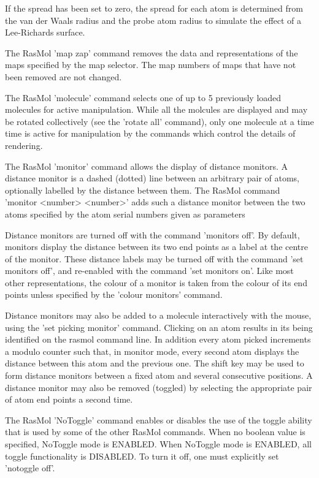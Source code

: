 If the spread has been set to zero, the spread for each atom is determined
from the van der Waals radius and the probe atom radius to simulate the
effect of a Lee-Richards surface.

The RasMol
'map zap'
command removes the data and representations of the
maps specified by the map selector.  The map numbers
of maps that have not been removed are not changed.

The RasMol
'molecule'
command selects one of up to 5 previously loaded molecules
for active manipulation.  While all the molcules are displayed
and may be rotated collectively (see the
'rotate all'
command), only one molecule at a time
time is active for manipulation by the commands which
control the details of rendering.

The RasMol
'monitor'
command allows the display of distance monitors. A distance
monitor is a dashed (dotted) line between an arbitrary pair
of atoms, optionally labelled by the distance between them.
The RasMol command
'monitor <number> <number>'
adds such a distance monitor between the two atoms specified by the atom
serial numbers given as parameters

Distance monitors are turned off with the command
'monitors off'.
By default, monitors display the
distance between its two end points as a label at the centre of
the monitor. These distance labels may be turned off with the
command
'set monitors off',
and re-enabled with the command
'set monitors on'.
Like most other representations,
the colour of a monitor is taken from the colour of its end points unless
specified by the
'colour monitors'
command.

Distance monitors may also be added to a molecule interactively with
the mouse, using the
'set picking monitor'
command. Clicking on an atom results
in its being identified on the rasmol command line. In addition
every atom picked increments a modulo counter such that, in monitor
mode, every second atom displays the distance between this atom and
the previous one. The shift key may be used to form distance monitors
between a fixed atom and several consecutive positions. A distance
monitor may also be removed (toggled) by selecting the appropriate
pair of atom end points a second time.

The RasMol
'NoToggle'
command enables or disables the use of the toggle ability
that is used by some of the other RasMol commands.
When no boolean value is specified, NoToggle mode is ENABLED.
When NoToggle mode is ENABLED, all toggle functionality is
DISABLED. To turn it off, one must explicitly set
'notoggle off'.

